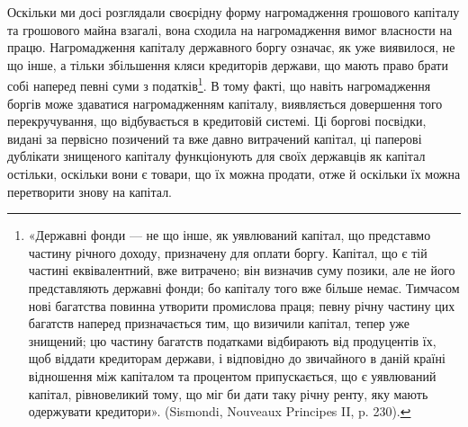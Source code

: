 Оскільки ми досі розглядали своєрідну форму нагромадження грошового
капіталу та грошового майна взагалі, вона сходила на нагромадження вимог
власности на працю. Нагромадження капіталу державного боргу означає, як уже
виявилося, не що інше, а тільки збільшення кляси кредиторів держави, що мають
право брати собі наперед певні суми з податків\footnote{
«Державні фонди — не що інше, як уявлюваний капітал, що представмо частину річного доходу,
призначену для оплати боргу. Капітал, що є тій частині еквівалентний, вже витрачено; він визначив
суму позики, але не його представляють державні фонди; бо капіталу того вже більше немає. Тимчасом
нові багатства повинна утворити промислова праця; певну річну частину цих багатств наперед
призначається
тим, що визичили капітал, тепер уже знищений; цю частину багатств податками відбирають
від продуцентів їх, щоб віддати кредиторам держави, і відповідно до звичайного в даній країні
відношення
між капіталом та процентом припускається, що є уявлюваний капітал, рівновеликий тому, що міг би
дати таку річну ренту, яку мають одержувати кредитори». (Sismondi, Nouveaux Principes II, p. 230).
}. В тому факті, що навіть нагромадження
боргів може здаватися нагромадженням капіталу, виявляється довершення
того перекручування, що відбувається в кредитовій системі. Ці боргові
посвідки, видані за первісно позичений та вже давно витрачений капітал, ці
паперові дублікати знищеного капіталу функціонують для своїх державців як
капітал остільки, оскільки вони є товари, що їх можна продати, отже й оскільки
їх можна перетворити знову на капітал.
